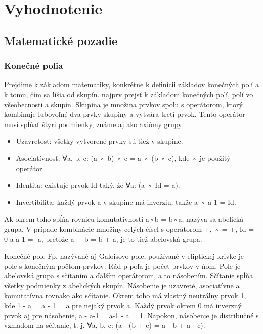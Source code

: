 
\chapter{Vyhodnotenie}\label{ch:evaluation}
\section{Matematické pozadie}\label{ch:problem}
\subsection{Konečné polia}

Prejdime k základom matematiky, konkrétne k definícii základov konečných polí a k tomu, čím sa líšia od skupín.
najprv prejsť k základom konečných polí, polí vo všeobecnosti a
skupín.
Skupina je množina prvkov spolu s operátorom, ktorý kombinuje ľubovoľné dva prvky skupiny a vytvára tretí prvok. Tento operátor musí spĺňať štyri podmienky, známe aj ako axiómy grupy:

\begin{itemize}
	\item Uzavretosť: všetky vytvorené prvky sú tiež v skupine.
	\item Asociatívnosť: ∀a, b, c: (a ◦ b) ◦ c = a ◦ (b ◦ c), kde ◦ je použitý operátor.
	\item  Identita: existuje prvok Id taký, že ∀a: (a ◦ Id = a).
	\item Invertibilita: každý prvok a v skupine má inverziu, takže
	a ◦ a-1 = Id.
\end{itemize}

Ak okrem toho spĺňa rovnicu komutatívnosti a◦b = b◦a,
nazýva sa abelická grupa. V prípade kombinácie množiny celých čísel
s operátorom +, ◦ = +, Id = 0 a a-1 = -a, pretože a + b = b + a,
je to tiež abelovská grupa.

Konečné pole Fp, nazývané aj Galoisovo pole, používané v eliptickej krivke
je pole s konečným počtom prvkov. Rád p
poľa je počet prvkov v ňom. Pole je abelovská grupa s
sčítaním a ďalším operátorom, a to násobením. Sčítanie spĺňa
všetky podmienky z abelických skupín. Násobenie je uzavreté, asociatívne
a komutatívna rovnako ako sčítanie. Okrem toho má
vlastný neutrálny prvok 1, kde 1 - a = a - 1 = a pre nejaký prvok
a. Každý prvok okrem 0 má inverzný prvok aj pre násobenie,
a - a-1 = a-1 - a = 1. Napokon, násobenie je distribučné s
vzhľadom na sčítanie, t. j. ∀a, b, c: (a - (b + c) = a - b + a - c).

